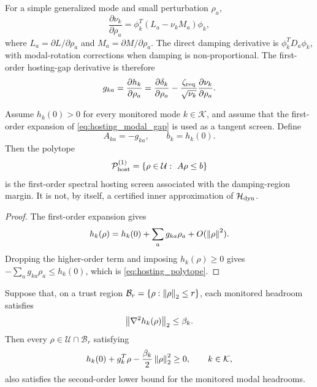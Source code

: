 For a simple generalized mode and small perturbation \(\rho_a\),
\begin{equation}
  \frac{\partial \nu_k}{\partial \rho_a}
  =
  \phi_k^T
  \left(
  L_a-\nu_k M_a
  \right)
  \phi_k,
  \label{eq:hosting_nu_derivative}
\end{equation}
where \(L_a=\partial L/\partial\rho_a\) and
\(M_a=\partial M/\partial\rho_a\). The direct damping derivative is
\(\phi_k^TD_a\phi_k\), with modal-rotation corrections when damping is
non-proportional. The first-order hosting-gap derivative is therefore
\begin{equation}
  g_{ka}
  =
  \frac{\partial h_k}{\partial\rho_a}
  =
  \frac{\partial\delta_k}{\partial\rho_a}
  -
  \frac{\zeta_{\rm req}}{\sqrt{\nu_k}}
  \frac{\partial\nu_k}{\partial\rho_a}.
  \label{eq:hosting_gap_gradient}
\end{equation}

\begin{proposition}
Assume \(h_k(0)>0\) for every monitored mode \(k\in\mathcal K\), and assume
that the first-order expansion of \eqref{eq:hosting_modal_gap} is used as a
tangent screen. Define
\begin{equation}
  A_{ka}=-g_{ka},
  \qquad
  b_k=h_k(0).
  \label{eq:hosting_polytope_matrices}
\end{equation}
Then the polytope
\begin{equation}
  \mathcal P_{\rm host}^{(1)}
  =
  \{\rho\in\mathcal U:\ A\rho\le b\}
  \label{eq:hosting_polytope}
\end{equation}
is the first-order spectral hosting screen associated with the damping-region
margin. It is not, by itself, a certified inner approximation of
\(\mathcal H_{\rm dyn}\).
\end{proposition}

\begin{proof}
The first-order expansion gives
\[
  h_k(\rho)=h_k(0)+\sum_a g_{ka}\rho_a+O(\left\lVert \rho \right\rVert^2).
\]
Dropping the higher-order term and imposing \(h_k(\rho)\ge0\) gives
\(-\sum_ag_{ka}\rho_a\le h_k(0)\), which is \eqref{eq:hosting_polytope}.
\end{proof}

\begin{proposition}
Suppose that, on a trust region \(\mathcal B_r=\{\rho:\left\lVert \rho \right\rVert_2\le r\}\),
each monitored headroom satisfies
\[
  \left\lVert \nabla^2 h_k(\rho) \right\rVert_2\le \beta_k .
\]
Then every \(\rho\in\mathcal U\cap\mathcal B_r\) satisfying
\begin{equation}
  h_k(0)+g_k^T\rho-\frac{\beta_k}{2}\left\lVert \rho \right\rVert_2^2\ge0,
  \qquad k\in\mathcal K,
  \label{eq:hosting_curvature_certificate}
\end{equation}
also satisfies the second-order lower bound for the monitored modal headrooms.
\end{proposition}

